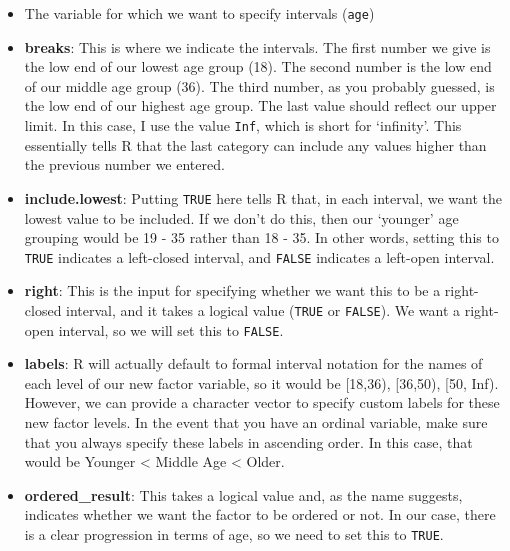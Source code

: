 \documentclass[
  letterpaper,
  DIV=11,
  numbers=noendperiod]{scrreprt}
\begin{document}
\begin{itemize}
\item
  The variable for which we want to specify intervals (\texttt{age})
\item
  \textbf{breaks}: This is where we indicate the intervals. The first
  number we give is the low end of our lowest age group (18). The second
  number is the low end of our middle age group (36). The third number,
  as you probably guessed, is the low end of our highest age group. The
  last value should reflect our upper limit. In this case, I use the
  value \texttt{Inf}, which is short for `infinity'. This essentially
  tells R that the last category can include any values higher than the
  previous number we entered.
\item
  \textbf{include.lowest}: Putting \texttt{TRUE} here tells R that, in
  each interval, we want the lowest value to be included. If we don't do
  this, then our `younger' age grouping would be 19 - 35 rather than 18
  - 35. In other words, setting this to \texttt{TRUE} indicates a
  left-closed interval, and \texttt{FALSE} indicates a left-open
  interval.
\item
  \textbf{right}: This is the input for specifying whether we want this
  to be a right-closed interval, and it takes a logical value
  (\texttt{TRUE} or \texttt{FALSE}). We want a right-open interval, so
  we will set this to \texttt{FALSE}.
\item
  \textbf{labels}: R will actually default to formal interval notation
  for the names of each level of our new factor variable, so it would be
  {[}18,36), {[}36,50), {[}50, Inf). However, we can provide a character
  vector to specify custom labels for these new factor levels. In the
  event that you have an ordinal variable, make sure that you always
  specify these labels in ascending order. In this case, that would be
  Younger \textless{} Middle Age \textless{} Older.
\item
  \textbf{ordered\_result}: This takes a logical value and, as the name
  suggests, indicates whether we want the factor to be ordered or not.
  In our case, there is a clear progression in terms of age, so we need
  to set this to \texttt{TRUE}.
\end{itemize}
\end{document}
